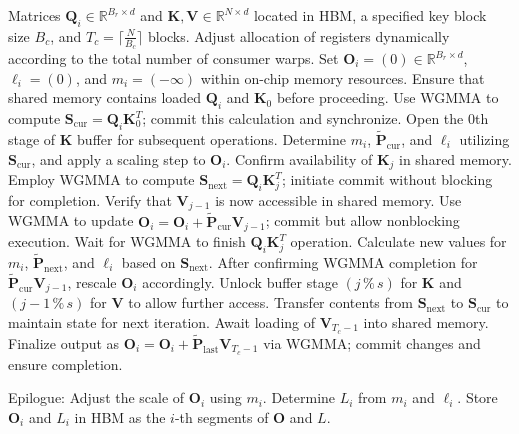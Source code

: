 \begin{algorithm}[H]
    \caption{\small\label{alg:flash3_wgmma}\textsc{FlashAttention-3} consumer warpgroup forward pass}
    \begin{algorithmic}[1]
      \REQUIRE  Matrices $\mathbf{Q}_i \in \mathbb{R}^{B_r \times d}$ and $\mathbf{K}, \mathbf{V} \in \mathbb{R}^{N \times d}$ located in HBM, a specified key block size $B_c$, and $T_c = \lceil \frac{N}{B_c} \rceil$ blocks.
      \STATE Adjust allocation of registers dynamically according to the total number of consumer warps.
      \STATE Set $\mathbf{O}_i = (0) \in \mathbb{R}^{B_r \times d}$, $\ell_i = (0)$, and $m_i = (-\infty)$ within on-chip memory resources.
      \STATE Ensure that shared memory contains loaded $\mathbf{Q}_i$ and $\mathbf{K}_0$ before proceeding.
      \STATE Use WGMMA to compute $\mathbf{S}_{\mathrm{cur}} = \mathbf{Q}_i \mathbf{K}_0^T$; commit this calculation and synchronize.
      \STATE Open the $0$th stage of $\mathbf{K}$ buffer for subsequent operations.
      \STATE Determine $m_{i}$, $\tilde{\mathbf{P}}_{\mathrm{cur}}$, and $\ell_{i}$ utilizing $\mathbf{S}_{\mathrm{cur}}$, and apply a scaling step to $\mathbf{O}_i$.
        \STATE Confirm availability of $\mathbf{K}_j$ in shared memory.
        \label{code:mainloop_start}
        \STATE Employ WGMMA to compute $\mathbf{S}_{\mathrm{next}} = \mathbf{Q}_i \mathbf{K}_{j}^T$; initiate commit without blocking for completion. \label{code:first_wgmma}
        \STATE Verify that $\mathbf{V}_{j-1}$ is now accessible in shared memory.
        \STATE Use WGMMA to update $\mathbf{O}_{i} = \mathbf{O}_{i} + \tilde{\mathbf{P}}_{\mathrm{cur}} \mathbf{V}_{j-1}$; commit but allow nonblocking execution. \label{code:second_wgmma}
        \STATE Wait for WGMMA to finish $\mathbf{Q}_i \mathbf{K}_{j}^T$ operation.
        \STATE Calculate new values for $m_{i}$, $\tilde{\mathbf{P}}_{\mathrm{next}}$, and $\ell_{i}$ based on $\mathbf{S}_{\mathrm{next}}$. \label{code:softmax}
        \STATE After confirming WGMMA completion for $\tilde{\mathbf{P}}_{\mathrm{cur}} \mathbf{V}_{j-1}$, rescale $\mathbf{O}_i$ accordingly.
        \STATE Unlock buffer stage $(j\,\%\,s)$ for $\mathbf{K}$ and $(j-1\,\%\,s)$ for $\mathbf{V}$ to allow further access.
        \STATE Transfer contents from $\mathbf{S}_{\mathrm{next}}$ to $\mathbf{S}_{\mathrm{cur}}$ to maintain state for next iteration.
        \label{code:mainloop_end}
      \ENDFOR \STATE Await loading of $\mathbf{V}_{T_c - 1}$ into shared memory.
      \STATE Finalize output as $\mathbf{O}_{i} = \mathbf{O}_{i} + \tilde{\mathbf{P}}_{\mathrm{last}} \mathbf{V}_{T_c - 1}$ via WGMMA; commit changes and ensure completion.

\STATE Epilogue: Adjust the scale of $\mathbf{O}_{i}$ using $m_{i}$. Determine $L_{i}$ from $m_{i}$ and $\ell_{i}$.  
Store $\mathbf{O}_{i}$ and $L_{i}$ in HBM as the $i$-th segments of $\mathbf{O}$ and $L$.  
\end{algorithmic}
\end{algorithm}

